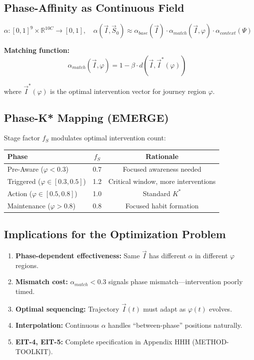 \subsection{Phase-Affinity as Continuous Field}

\begin{equation}
\boxed{
\alpha: [0,1]^9 \times \mathbb{R}^{10C} \to [0,1], \quad \alpha(\vec{I}, \vec{S}_0) \approx \alpha_{base}(\vec{I}) \cdot \alpha_{match}(\vec{I}, \varphi) \cdot \alpha_{context}(\Psi)
}
\label{eq:mp-phase-affinity}
\end{equation}

\textbf{Matching function:}
\begin{equation}
\alpha_{match}(\vec{I}, \varphi) = 1 - \beta \cdot d(\vec{I}, \vec{I}^*(\varphi))
\label{eq:mp-matching}
\end{equation}

where $\vec{I}^*(\varphi)$ is the optimal intervention vector for journey region $\varphi$.

\subsection{Phase-K* Mapping (EMERGE)}

Stage factor $f_S$ modulates optimal intervention count:

\begin{center}
\renewcommand{\arraystretch}{1.2}
\begin{tabular}{@{}lcc@{}}
\toprule
\textbf{Phase} & \textbf{$f_S$} & \textbf{Rationale} \\
\midrule
Pre-Aware ($\varphi < 0.3$) & 0.7 & Focused awareness needed \\
Triggered ($\varphi \in [0.3, 0.5]$) & 1.2 & Critical window, more interventions \\
Action ($\varphi \in [0.5, 0.8]$) & 1.0 & Standard $K^*$ \\
Maintenance ($\varphi > 0.8$) & 0.8 & Focused habit formation \\
\bottomrule
\end{tabular}
\end{center}

\subsection{Implications for the Optimization Problem}

\begin{enumerate}[nosep]
\item \textbf{Phase-dependent effectiveness:} Same $\vec{I}$ has different $\alpha$ in different $\varphi$ regions.
\item \textbf{Mismatch cost:} $\alpha_{match} < 0.3$ signals phase mismatch---intervention poorly timed.
\item \textbf{Optimal sequencing:} Trajectory $\vec{I}(t)$ must adapt as $\varphi(t)$ evolves.
\item \textbf{Interpolation:} Continuous $\alpha$ handles ``between-phase'' positions naturally.
\item \textbf{EIT-4, EIT-5:} Complete specification in Appendix HHH (METHOD-TOOLKIT).
\end{enumerate}

